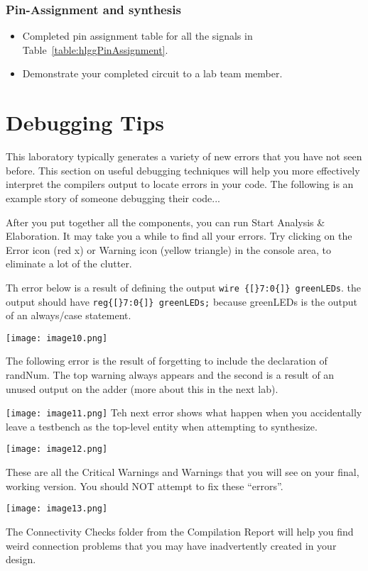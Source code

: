 \subsubsection{Pin-Assignment and synthesis}

\begin{itemize}
\item Completed pin assignment table for all the signals in Table~\ref{table:hlggPinAssignment}.
\item Demonstrate your completed circuit to a lab team member.
\end{itemize}


\section{Debugging Tips}
\label{section:guessGameDebugging}
This laboratory typically generates a variety of new errors that you 
have not seen before.  This section on useful debugging techniques 
will help you more effectively 
interpret the compilers output to locate errors in your code.
The following is an example story of someone debugging their code...

After you put together all the components, you can run Start Analysis \&
Elaboration. It may take you a while to find all your errors.  Try
clicking on the Error icon (red x) or Warning icon (yellow
triangle) in the console area, to eliminate a lot of the clutter.

Th error below is a result of defining the output \verb+wire {[}7:0{]} greenLEDs+.
the output should have  \verb+reg{[}7:0{]} greenLEDs;+ because greenLEDs is the 
output of an always/case statement.

\texttt{[image: image10.png]}

The following error is the result of forgetting to include the declaration of randNum. 
The top warning always appears and the second is a result of an unused output on 
the adder (more about this in the next lab).

\texttt{[image: image11.png]}
Teh next error shows what happen when you accidentally leave a testbench as the 
top-level entity when attempting to synthesize.

\texttt{[image: image12.png]}

These are all the Critical Warnings and Warnings that you will see on your final,
working version. You should NOT attempt to fix these ``errors''.

\texttt{[image: image13.png]}

The Connectivity Checks folder from the Compilation Report will help you
find weird connection problems that you may have inadvertently created
in your design. 
